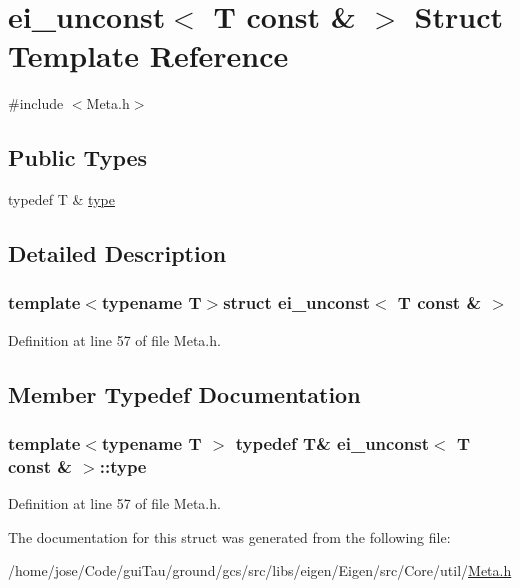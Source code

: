 \hypertarget{structei__unconst_3_01_t_01const_01_6_01_4}{\section{ei\-\_\-unconst$<$ T const \& $>$ Struct Template Reference}
\label{structei__unconst_3_01_t_01const_01_6_01_4}
}


{\ttfamily \#include $<$Meta.\-h$>$}

\subsection*{Public Types}
\begin{DoxyCompactItemize}
\item 
typedef T \& \hyperlink{structei__unconst_3_01_t_01const_01_6_01_4_a8669a05a6ac3911e96b033095a38025c}{type}
\end{DoxyCompactItemize}


\subsection{Detailed Description}
\subsubsection*{template$<$typename T$>$struct ei\-\_\-unconst$<$ T const \& $>$}



Definition at line 57 of file Meta.\-h.



\subsection{Member Typedef Documentation}
\hypertarget{structei__unconst_3_01_t_01const_01_6_01_4_a8669a05a6ac3911e96b033095a38025c}{
\subsubsection[{type}]{\setlength{\rightskip}{0pt plus 5cm}template$<$typename T $>$ typedef T\& {\bf ei\-\_\-unconst}$<$ T const \& $>$\-::{\bf type}}}\label{structei__unconst_3_01_t_01const_01_6_01_4_a8669a05a6ac3911e96b033095a38025c}


Definition at line 57 of file Meta.\-h.



The documentation for this struct was generated from the following file\-:\begin{DoxyCompactItemize}
\item 
/home/jose/\-Code/gui\-Tau/ground/gcs/src/libs/eigen/\-Eigen/src/\-Core/util/\hyperlink{_meta_8h}{Meta.\-h}\end{DoxyCompactItemize}

